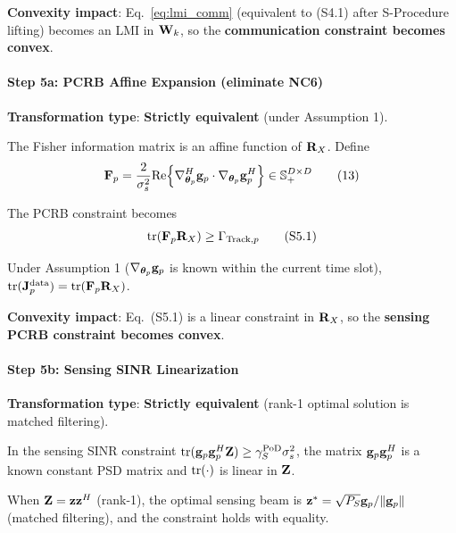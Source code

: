 \textbf{Convexity impact}: Eq.~\eqref{eq:lmi_comm} (equivalent to (S4.1) after S-Procedure lifting) becomes an LMI in $\mathbf{W}_k$, so the \textbf{communication constraint becomes convex}.

\paragraph{Step 5a: PCRB Affine Expansion (eliminate NC6)}
\textbf{Transformation type}: \textbf{Strictly equivalent} (under Assumption 1).

The Fisher information matrix is an affine function of $\mathbf{R}_X$. Define
\begin{equation}
\mathbf{F}_p = \frac{2}{\sigma_s^2} \text{Re}\Big\{ \nabla_{\boldsymbol{\theta}_p}^H \mathbf{g}_p \cdot \nabla_{\boldsymbol{\theta}_p} \mathbf{g}_p^H \Big\} \in \mathbb{S}_+^{D\times D} \tag{13}
\end{equation}

The PCRB constraint becomes
\begin{equation}
\text{tr}(\mathbf{F}_p \mathbf{R}_X) \geq \Gamma_{\text{Track},p} \tag{S5.1}
\end{equation}

\begin{proposition}\label{prop:pcrb}
Under Assumption 1 ($\nabla_{\boldsymbol{\theta}_p}\mathbf{g}_p$ is known within the current time slot), $\text{tr}(\mathbf{J}_p^{\text{data}}) = \text{tr}(\mathbf{F}_p \mathbf{R}_X)$.
\end{proposition}

\textbf{Convexity impact}: Eq.~(S5.1) is a linear constraint in $\mathbf{R}_X$, so the \textbf{sensing PCRB constraint becomes convex}.

\paragraph{Step 5b: Sensing SINR Linearization}
\textbf{Transformation type}: \textbf{Strictly equivalent} (rank-1 optimal solution is matched filtering).

In the sensing SINR constraint $\text{tr}(\mathbf{g}_p\mathbf{g}_p^H \mathbf{Z}) \geq \gamma_S^{\text{PoD}} \sigma_s^2$, the matrix $\mathbf{g}_p\mathbf{g}_p^H$ is a known constant PSD matrix and $\text{tr}(\cdot)$ is linear in $\mathbf{Z}$.

\begin{proposition}\label{prop:sens_sinr}
When $\mathbf{Z} = \mathbf{z}\mathbf{z}^H$ (rank-1), the optimal sensing beam is $\mathbf{z}^* = \sqrt{P_S} \mathbf{g}_p/\|\mathbf{g}_p\|$ (matched filtering), and the constraint holds with equality.
\end{proposition}

